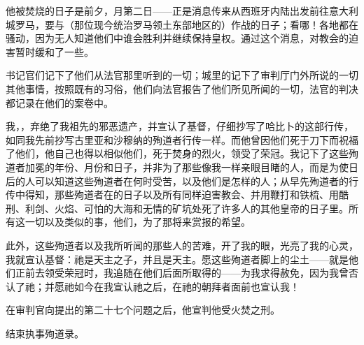 他被焚烧的日子是前夕，月第二日——正是消息传来从西班牙内陆出发前往意大利城罗马，要与（那位现今统治罗马领土东部地区的）作战的日子；看哪！各地都在骚动，因为无人知道他们中谁会胜利并继续保持皇权。通过这个消息，对教会的迫害暂时缓和了一些。\par

书记官们记下了他们从法官那里听到的一切；城里的记下了审判厅门外所说的一切其他事情，按照既有的习俗，他们向法官报告了他们所见所闻的一切，法官的判决都记录在他们的案卷中。\par

我，，弃绝了我祖先的邪恶遗产，并宣认了基督，仔细抄写了哈比卜的这部行传，如同我先前抄写古里亚和沙穆纳的殉道者行传一样。而他曾因他们死于刀下而祝福了他们，他自己也得以相似他们，死于焚身的烈火，领受了荣冠。我记下了这些殉道者加冕的年份、月份和日子，并非为了那些像我一样亲眼目睹的人，而是为使日后的人可以知道这些殉道者在何时受苦，以及他们是怎样的人；从早先殉道者的行传中得知，那些殉道者在的日子以及所有同样迫害教会、并用鞭打和铁梳、用酷刑、利剑、火焰、可怕的大海和无情的矿坑处死了许多人的其他皇帝的日子里。所有这一切以及类似的事，他们，为了那将来赏报的希望。\par

此外，这些殉道者以及我所听闻的那些人的苦难，开了我的眼，光亮了我的心灵，我就宣认基督：祂是天主之子，并且是天主。愿这些殉道者脚上的尘土——就是他们正前去领受荣冠时，我追随在他们后面所取得的——为我求得赦免，因为我曾否认了祂；并愿祂如今在我宣认祂之后，在祂的朝拜者面前也宣认我！\par

在审判官向提出的第二十七个问题之后，他宣判他受火焚之刑。\par

结束执事殉道录。\par

